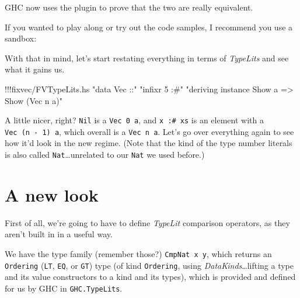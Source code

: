\documentclass[]{article}
\newenvironment{Shaded}{}{}
\newcommand{\KeywordTok}[1]{\textcolor[rgb]{0.00,0.44,0.13}{\textbf{{#1}}}}
\newcommand{\StringTok}[1]{\textcolor[rgb]{0.25,0.44,0.63}{{#1}}}
\newcommand{\CommentTok}[1]{\textcolor[rgb]{0.38,0.63,0.69}{\textit{{#1}}}}
\newcommand{\FunctionTok}[1]{\textcolor[rgb]{0.02,0.16,0.49}{{#1}}}
\newcommand{\NormalTok}[1]{{#1}}
\begin{document}
GHC now uses the plugin to prove that the two are really equivalent.

If you wanted to play along or try out the code samples, I recommend you
use a sandbox:

\begin{Shaded}
\end{Shaded}

With that in mind, let's start restating everything in terms of
\emph{TypeLits} and see what it gains us.

\begin{Shaded}
\begin{Highlighting}[]
\FunctionTok{!!!}\NormalTok{fixvec}\FunctionTok{/}\NormalTok{FVTypeLits.hs }\StringTok{"data Vec ::"} \StringTok{"infixr 5 :#"} \StringTok{"deriving instance Show a => Show (Vec n a)"}
\end{Highlighting}
\end{Shaded}

A little nicer, right? \texttt{Nil} is a \texttt{Vec\ 0\ a}, and
\texttt{x\ :\#\ xs} is an element with a \texttt{Vec\ (n\ -\ 1)\ a},
which overall is a \texttt{Vec\ n\ a}. Let's go over everything again to
see how it'd look in the new regime. (Note that the kind of the type
number literals is also called \texttt{Nat}\ldots{}unrelated to our
\texttt{Nat} we used before.)

\section{A new look}\label{a-new-look}

First of all, we're going to have to define \emph{TypeLit} comparison
operators, as they aren't built in in a useful way.

We have the type family (remember those?) \texttt{CmpNat\ x\ y}, which
returns an \texttt{Ordering} (\texttt{LT}, \texttt{EQ}, or \texttt{GT})
type (of kind \texttt{Ordering}, using \emph{DataKinds}\ldots{}lifting a
type and its value constructors to a kind and its types), which is
provided and defined for us by GHC in \texttt{GHC.TypeLits}.
\end{document}
